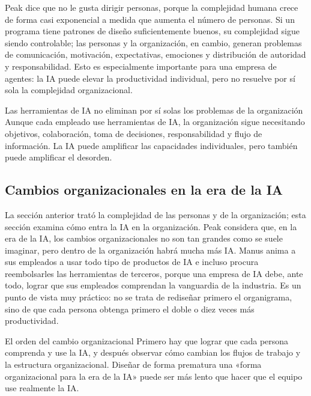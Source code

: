 \documentclass[a4paper]{article}
\begin{document}
Peak dice que no le gusta dirigir personas, porque la complejidad humana crece de forma casi exponencial a medida que aumenta el número de personas. Si un programa tiene patrones de diseño suficientemente buenos, su complejidad sigue siendo controlable; las personas y la organización, en cambio, generan problemas de comunicación, motivación, expectativas, emociones y distribución de autoridad y responsabilidad. Esto es especialmente importante para una empresa de agentes: la IA puede elevar la productividad individual, pero no resuelve por sí sola la complejidad organizacional.

\begin{warningbox}{Las herramientas de IA no eliminan por sí solas los problemas de la organización}
Aunque cada empleado use herramientas de IA, la organización sigue necesitando objetivos, colaboración, toma de decisiones, responsabilidad y flujo de información. La IA puede amplificar las capacidades individuales, pero también puede amplificar el desorden.
\end{warningbox}

\subsection{Cambios organizacionales en la era de la IA}

La sección anterior trató la complejidad de las personas y de la organización; esta sección examina cómo entra la IA en la organización. Peak considera que, en la era de la IA, los cambios organizacionales no son tan grandes como se suele imaginar, pero dentro de la organización habrá mucha más IA. Manus anima a sus empleados a usar todo tipo de productos de IA e incluso procura reembolsarles las herramientas de terceros, porque una empresa de IA debe, ante todo, lograr que sus empleados comprendan la vanguardia de la industria. Es un punto de vista muy práctico: no se trata de rediseñar primero el organigrama, sino de que cada persona obtenga primero el doble o diez veces más productividad.

\begin{importantbox}{El orden del cambio organizacional}
Primero hay que lograr que cada persona comprenda y use la IA, y después observar cómo cambian los flujos de trabajo y la estructura organizacional. Diseñar de forma prematura una «forma organizacional para la era de la IA» puede ser más lento que hacer que el equipo use realmente la IA.
\end{importantbox}
\end{document}
